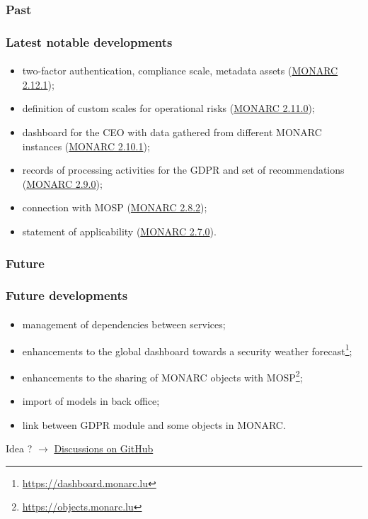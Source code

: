 \subsubsection{Past}
\begin{frame}
  \frametitle{Latest notable developments}
  \framesubtitle{}
  \begin{itemize}
    \item two-factor authentication, compliance scale, metadata assets
      (\href{https://www.monarc.lu/news/2022/06/22/monarc-2121-released/}{MONARC 2.12.1});
    \item definition of custom scales for operational risks
      (\href{https://www.monarc.lu/news/2021/09/02/monarc-2110-released/}{MONARC 2.11.0});
    \item dashboard for the CEO with data gathered from different MONARC instances
      (\href{https://www.monarc.lu/news/2020/12/18/monarc-2101-released/}{MONARC 2.10.1});
    \item records of processing activities for the GDPR and set of recommendations
      (\href{https://www.monarc.lu/news/2019/08/23/monarc-290-released/}{MONARC 2.9.0});
    \item connection with MOSP
      (\href{https://www.monarc.lu/news/2019/05/28/monarc-282-released/}{MONARC 2.8.2});
    \item statement of applicability
      (\href{https://www.monarc.lu/news/2018/08/22/monarc-270-released/}{MONARC 2.7.0}).
  \end{itemize}
\end{frame}

\subsubsection{Future}
\begin{frame}
  \frametitle{Future developments}
  \framesubtitle{}
  \begin{itemize}
    \item management of dependencies between services;
    \item enhancements to the global dashboard towards a
    security weather forecast\footnote{\url{https://dashboard.monarc.lu}};
    \item enhancements to the sharing of MONARC objects with
    MOSP\footnote{\url{https://objects.monarc.lu}};
    \item import of models in back office;
    \item link between GDPR module and some objects in MONARC.
  \end{itemize}
  \bigskip
  Idea ?
  $\rightarrow$
  \href{https://github.com/monarc-project/MonarcAppFO/discussions/categories/ideas}{Discussions on GitHub}
\end{frame}
